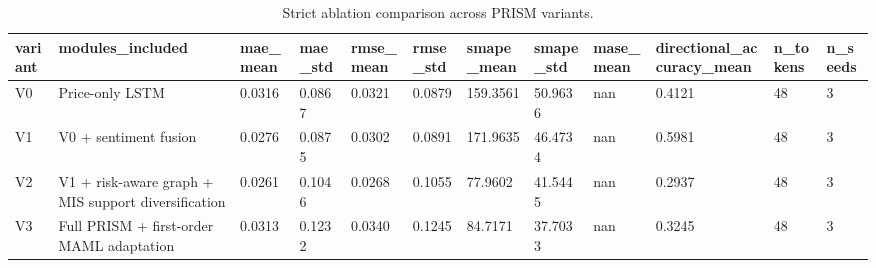 \begin{table}[htbp]
\centering
\begin{tabular}{llllllllllll}
\hline
variant & modules_included & mae_mean & mae_std & rmse_mean & rmse_std & smape_mean & smape_std & mase_mean & directional_accuracy_mean & n_tokens & n_seeds \\
\hline
V0 & Price-only LSTM & 0.0316 & 0.0867 & 0.0321 & 0.0879 & 159.3561 & 50.9636 & nan & 0.4121 & 48 & 3 \\
V1 & V0 + sentiment fusion & 0.0276 & 0.0875 & 0.0302 & 0.0891 & 171.9635 & 46.4734 & nan & 0.5981 & 48 & 3 \\
V2 & V1 + risk-aware graph + MIS support diversification & 0.0261 & 0.1046 & 0.0268 & 0.1055 & 77.9602 & 41.5445 & nan & 0.2937 & 48 & 3 \\
V3 & Full PRISM + first-order MAML adaptation & 0.0313 & 0.1232 & 0.0340 & 0.1245 & 84.7171 & 37.7033 & nan & 0.3245 & 48 & 3 \\
\hline
\end{tabular}
\caption{Strict ablation comparison across PRISM variants.}
\label{table_ablation}
\end{table}